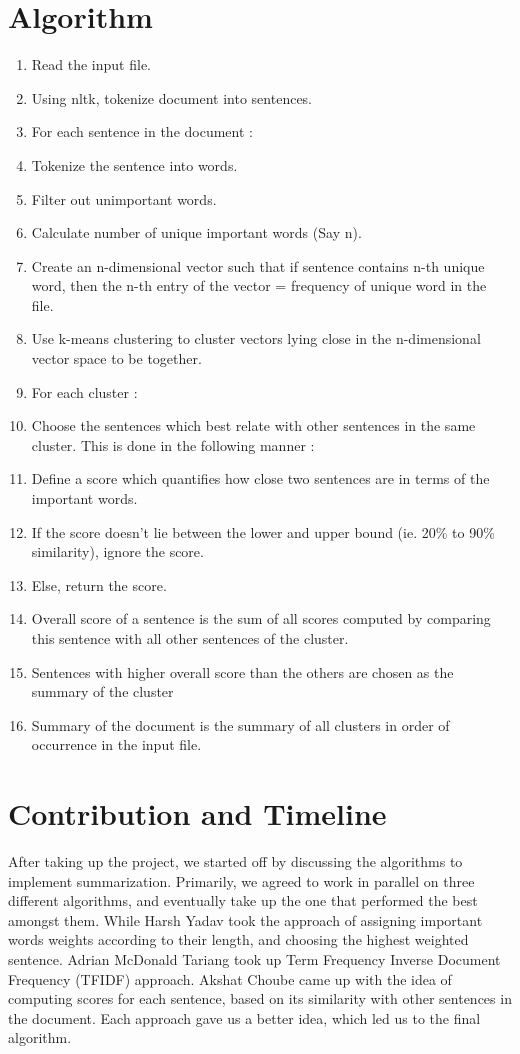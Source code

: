 \section{Algorithm}
\begin{enumerate}
\item Read the input file. 
\item Using nltk, tokenize document into sentences.
\item For each sentence in the document :
\item Tokenize the sentence into words. 
\item Filter out unimportant words.
\item Calculate number of unique important words (Say n).
\item Create an n-dimensional vector such that if sentence contains n-th
unique word, then the n-th entry of the vector = frequency of unique
word in the file. 
\item Use k-means clustering to cluster vectors lying close in the n-dimensional
vector space to be together. 
\item For each cluster :
\item Choose the sentences which best relate with other sentences in the
same cluster. This is done in the following manner :
\item Define a score which quantifies how close two sentences are in terms
of the important words. 
\item If the score doesn\textquoteright t lie between the lower and upper
bound (ie. 20\% to 90\% similarity), ignore the score. 
\item Else, return the score.
\item Overall score of a sentence is the sum of all scores computed by comparing
this sentence with all other sentences of the cluster.
\item Sentences with higher overall score than the others are chosen as
the summary of the cluster
\item Summary of the document is the summary of all clusters in order of
occurrence in the input file.
\end{enumerate}

\section{Contribution and Timeline}

After taking up the project, we started off by discussing the algorithms
to implement summarization. Primarily, we agreed to work in parallel
on three different algorithms, and eventually take up the one that
performed the best amongst them. While Harsh Yadav took the approach
of assigning important words weights according to their length, and
choosing the highest weighted sentence. Adrian McDonald Tariang took
up Term Frequency Inverse Document Frequency (TFIDF) approach. Akshat
Choube came up with the idea of computing scores for each sentence,
based on its similarity with other sentences in the document. Each
approach gave us a better idea, which led us to the final algorithm.

